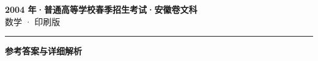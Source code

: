 \documentclass[zihao=5, a4paper]{ctexart}
\begin{document}
\begin{center}
  {\Large\bfseries 2004 年·普通高等学校春季招生考试·安徽卷文科}\\[4pt]
  {\large 数学 · 印刷版}
\end{center}
\medskip
{}

\par\bigskip\hrule\bigskip
{}
\begin{center}{\large\bfseries 参考答案与详细解析}\end{center}
\smallskip

\end{document}
